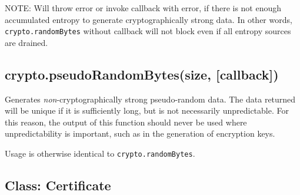 \begin{Shaded}
\end{Shaded}

NOTE: Will throw error or invoke callback with error, if there is not
enough accumulated entropy to generate cryptographically strong data. In
other words, \texttt{crypto.randomBytes} without callback will not block
even if all entropy sources are drained.

\subsection{crypto.pseudoRandomBytes(size,
{[}callback{]})}\label{crypto.pseudorandombytessize-callback}

Generates \emph{non}-cryptographically strong pseudo-random data. The
data returned will be unique if it is sufficiently long, but is not
necessarily unpredictable. For this reason, the output of this function
should never be used where unpredictability is important, such as in the
generation of encryption keys.

Usage is otherwise identical to \texttt{crypto.randomBytes}.

\subsection{Class: Certificate}\label{class-certificate}

